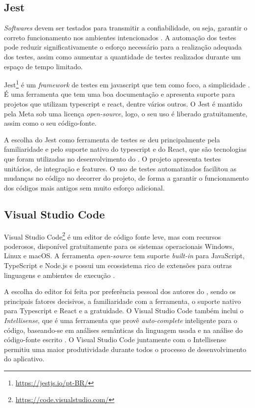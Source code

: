 \subsection{Jest}

\textit{Softwares} devem ser testados para transmitir a confiabilidade, ou seja, garantir o correto funcionamento nos ambientes intencionados \cite{test_automation}. A automação dos testes pode reduzir significativamente o esforço necessário para a realização adequada dos testes, assim como aumentar a quantidade de testes realizados durante um espaço de tempo limitado.

Jest\footnote{\url{https://jestjs.io/pt-BR/}} é um \textit{framework} de testes em javascript que tem como foco, a simplicidade \cite{jest}. É uma ferramenta que tem uma boa documentação e apresenta suporte para projetos que utilizam typescript e react, dentre vários outros. O Jest é mantido pela Meta sob uma licença \textit{open-source}, logo, o seu uso é liberado gratuitamente, assim como o seu código-fonte.

A escolha do Jest como ferramenta de testes se deu principalmente pela familiaridade e pelo suporte nativo do typescript e do React, que são tecnologias que foram utilizadas no desenvolvimento do \appName. O projeto apresenta testes unitários, de integração e features. O uso de testes automatizados facilitou as mudanças no código no decorrer do projeto, de forma a garantir o funcionamento dos códigos mais antigos sem muito esforço adicional.

\subsection{Visual Studio Code}

Visual Studio Code\footnote{\url{https://code.visualstudio.com/}} é um editor de código fonte leve, mas com recursos poderosos, disponível gratuitamente para os sistemas operacionais Windows, Linux e macOS. A ferramenta \textit{open-source} tem suporte \textit{built-in} para JavaScript, TypeScript e Node.js e possui um ecossistema rico de extensões para outras linguagens e ambientes de execução \cite{vscode}.

A escolha do editor foi feita por preferência pessoal dos autores do \appName, sendo os principais fatores decisivos, a familiaridade com a ferramenta, o suporte nativo para Typescript e React e a gratuidade. O Visual Studio Code também inclui o \textit{Intellisense}, que é uma ferramenta que provê \textit{auto-complete} inteligente para o código, baseando-se em análises semânticas da linguagem usada e na análise do código-fonte escrito \cite{intellisense}. O Visual Studio Code juntamente com o Intellisense permitiu uma maior produtividade durante todos o processo de desenvolvimento do aplicativo.

